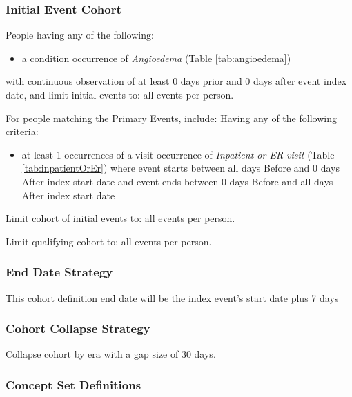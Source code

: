 \documentclass[10.5pt]{book}
\providecommand{\tightlist}{%
  \setlength{\itemsep}{0pt}\setlength{\parskip}{0pt}}
\theoremstyle{definition}
\theoremstyle{definition}
\theoremstyle{definition}
\theoremstyle{remark}
\begin{document}
\subsubsection*{Initial Event Cohort}\label{initial-event-cohort-3}

People having any of the following:

\begin{itemize}
\tightlist
\item
  a condition occurrence of \emph{Angioedema} (Table
  \ref{tab:angioedema})
\end{itemize}

with continuous observation of at least 0 days prior and 0 days after
event index date, and limit initial events to: all events per person.

For people matching the Primary Events, include: Having any of the
following criteria:

\begin{itemize}
\tightlist
\item
  at least 1 occurrences of a visit occurrence of \emph{Inpatient or ER
  visit} (Table \ref{tab:inpatientOrEr}) where event starts between all
  days Before and 0 days After index start date and event ends between 0
  days Before and all days After index start date
\end{itemize}

Limit cohort of initial events to: all events per person.

Limit qualifying cohort to: all events per person.

\subsubsection*{End Date Strategy}\label{end-date-strategy-3}

This cohort definition end date will be the index event's start date
plus 7 days

\subsubsection*{Cohort Collapse
Strategy}\label{cohort-collapse-strategy-3}

Collapse cohort by era with a gap size of 30 days.

\subsubsection*{Concept Set
Definitions}\label{concept-set-definitions-3}
\end{document}
